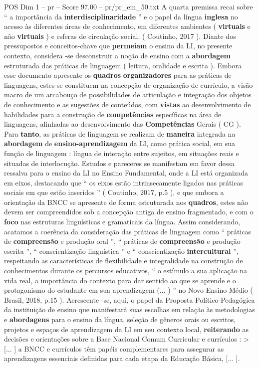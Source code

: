 \begin{textsample}{POS Dim 1 – pr – Score 97.00 – pr/pr\_em\_50.txt}
A quarta premissa recai sobre “ a importância da \textbf{interdisciplinaridade} ” e o papel da língua \textbf{inglesa} no acesso às diferentes áreas de conhecimento, em diferentes ambientes ( \textbf{virtuais} e não \textbf{virtuais} ) e esferas de circulação social. ( Coutinho, 2017 ).
Diante dos pressupostos e conceitos-chave que \textbf{permeiam} o ensino da LI, no presente contexto, considera -se desconstruir a noção de ensino com a \textbf{abordagem} estruturada das práticas de linguagem ( leitura, oralidade e escrita ).
Embora esse documento apresente os \textbf{quadros} \textbf{organizadores} para as práticas de linguagens, estes se constituem na concepção de organização de currículo, a visão macro de um arcabouço de possibilidades de articulação e integração dos objetos de conhecimento e as sugestões de conteúdos, com \textbf{vistas} ao desenvolvimento de habilidades para a construção de \textbf{competências} específicas na área de linguagens, alinhadas ao desenvolvimento das \textbf{Competências} Gerais ( CG ).
Para \textbf{tanto}, as práticas de linguagem se realizam de \textbf{maneira} integrada na \textbf{abordagem} de \textbf{ensino-aprendizagem} da LI, como prática social, em sua função de linguagem : língua de interação entre sujeitos, em situações reais e situadas de interlocução.
Estudos e pareceres se manifestam em favor dessa ressalva para o ensino da LI no Ensino Fundamental, onde a LI está organizada em eixos, destacando que “ os eixos estão intrinsecamente ligados nas práticas sociais em que estão inseridos ” ( Coutinho, 2017, p.5 ), e que embora a orientação da BNCC se apresente de forma estruturada nos \textbf{quadros}, estes não devem ser compreendidos sob a concepção antiga de ensino fragmentado, e com o \textbf{foco} nas estruturas linguísticas e gramaticais da língua.
Assim considerando, acatamos a coerência da consideração das práticas de linguagem como “ práticas de \textbf{compreensão} e produção oral ”, “ práticas de \textbf{compreensão} e produção escrita ”, “ conscientização linguística ” e “ conscientização \textbf{intercultural} ”, respeitando as características de flexibilidade e integralidade na construção de conhecimentos durante os percursos educativos, “ o estímulo a sua aplicação na vida real, a importância do contexto para dar sentido ao que se aprende e o protagonismo do estudante em sua aprendizagem (... ) ” no Novo Ensino Médio ( Brasil, 2018, p.15 ).
Acrescente -se, aqui, o papel da Proposta Político-Pedagógica da instituição de ensino que manifestará suas escolhas em relação às metodologias e \textbf{abordagens} para o ensino da língua, seleção de gêneros orais ou escritos, projetos e espaços de aprendizagem da LI em seu contexto local, \textbf{reiterando} as decisões e orientações sobre a Base Nacional Comum Curricular e currículos : > [... ] a BNCC e currículos têm papéis complementares para assegurar as aprendizagens essenciais definidas para cada etapa da Educação Básica, [... ].

\end{textsample}
